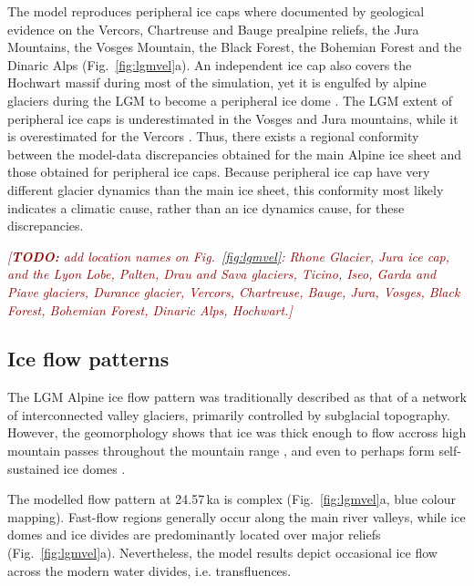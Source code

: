 \documentclass[tc, manuscript]{copernicus}
\newcommand{\todo}[1]{\textcolor{darkred}{\emph{[\textbf{TODO:} #1]}}}
\begin{document}
    The model reproduces peripheral ice caps where documented by geological
    evidence on the Vercors, Chartreuse and Bauge prealpine reliefs,
    the Jura Mountains, the Vosges Mountain, the Black Forest, the Bohemian
    Forest and the Dinaric Alps (Fig.~\ref{fig:lgmvel}a). An independent ice
    cap also covers the Hochwart massif during most of the simulation, yet it
    is engulfed by alpine glaciers during the LGM to become a peripheral ice
    dome \citep[Fig.~\ref{fig:lgmvel}a; cf.][Fig.~2.5]{Husen.2011}. The LGM
    extent of peripheral ice caps is underestimated in the Vosges and Jura
    mountains, while it is overestimated for the Vercors
    \citep[Fig.~\ref{fig:lgmvel}a; cf.][Figs.~4.28, 4.32, and
    4.33]{Coutterand.2010}. Thus, there exists a regional conformity between
    the model-data discrepancies obtained for the main Alpine ice sheet and
    those obtained for peripheral ice caps. Because peripheral ice cap have
    very different glacier dynamics than the main ice sheet, this conformity
    most likely indicates a climatic cause, rather than an ice dynamics cause,
    for these discrepancies.

    \todo{add location names on Fig.~\ref{fig:lgmvel}: Rhone Glacier, Jura ice
          cap, and the Lyon Lobe, Palten, Drau and Sava glaciers, Ticino, Iseo,
          Garda and Piave glaciers, Durance glacier, Vercors, Chartreuse,
          Bauge, Jura, Vosges, Black Forest, Bohemian Forest, Dinaric Alps,
          Hochwart.}


\subsection{Ice flow patterns}
\label{sec:flow}

    The LGM Alpine ice flow pattern was traditionally described as that of a
    network of interconnected valley glaciers, primarily controlled by
    subglacial topography. However, the geomorphology shows that ice was thick
    enough to flow accross high mountain passes throughout the mountain range
    \citep[e.g.,][]{Onde.1938, Penck.Bruckner.1909, Jackli.1962, Husen.1985,
    Coutterand.2010, Kelly.etal.2004, Husen.2011}, and even to perhaps form
    self-sustained ice domes \citep{Florineth.1998, Florineth.Schluchter.1998,
    Kelly.etal.2004, Bini.etal.2009}.

    The modelled flow pattern at 24.57\,ka is complex (Fig.~\ref{fig:lgmvel}a,
    blue colour mapping). Fast-flow regions generally occur along the main
    river valleys, while ice domes and ice divides are predominantly located
    over major reliefs (Fig.~\ref{fig:lgmvel}a). Nevertheless, the model
    results depict occasional ice flow across the modern water divides, i.e.
    transfluences.
\end{document}
